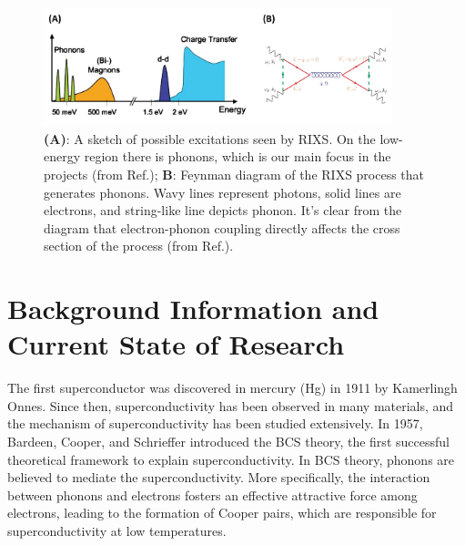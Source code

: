 \documentclass[11pt]{article}
\begin{document}
\begin{figure}[!t]
    \centering
    \includegraphics[width=0.9\textwidth]{figures/figure2.jpg}
    \caption{\textbf{(A)}: A sketch of possible excitations seen by RIXS. On the low-energy region there is phonons, which is our main focus in the projects (from Ref.\cite{ament_resonant_2011}); \textbf{B}: Feynman diagram of the RIXS process that generates phonons. Wavy lines represent photons, solid lines are electrons, and string-like line depicts phonon. It's clear from the diagram that electron-phonon coupling directly affects the cross section of the process (from Ref.\cite{devereaux_directly_2016}).}  
    \label{second_figure}
\end{figure}

\section{Background Information and Current State of Research}

The first superconductor was discovered in mercury (Hg) in 1911 by Kamerlingh Onnes. Since then, superconductivity has been observed in many materials, and the mechanism of superconductivity has been studied extensively. In 1957, Bardeen, Cooper, and Schrieffer introduced the BCS theory, the first successful theoretical framework to explain superconductivity\cite{bardeen_theory_1957}. In BCS theory, phonons are believed to mediate the superconductivity. More specifically, the interaction between phonons and electrons fosters an effective attractive force among electrons, leading to the formation of Cooper pairs, which are responsible for superconductivity at low temperatures\cite{bardeen_theory_1957}. 
\end{document}
